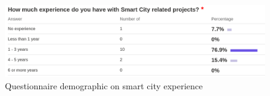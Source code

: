 \begin{figure}
    \centering
    \includegraphics[scale=0.33]{figures/png/questionnaire_SmartCity_Experience.png}
    \caption{Questionnaire demographic on smart city experience}
    \label{fig:questionnaire-smartcity-experience}
\end{figure}
